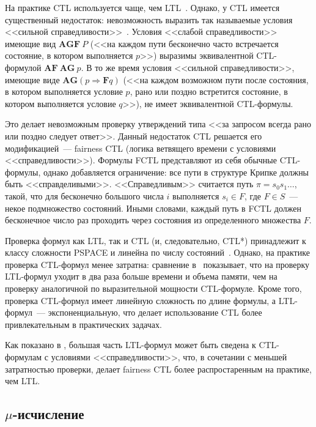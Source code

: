 \documentclass[a4paper,notitlepage,14pt]{article}
\begin{document}
На практике CTL используется чаще, чем LTL~\cite{Stirling96modaland}. Однако, у CTL
имеется существенный недостаток: невозможность выразить так называемые условия <<сильной
справедливости>>~\cite{Katoen,DBLP:conf/spin/FaragoS09}. Условия <<слабой справедливости>>
имеющие вид $\mathbf{AGF}~P$ (<<на каждом пути бесконечно часто встречается состояние, в
котором выполняется $p$>>) выразимы эквивалентной CTL-формулой $\mathbf{AF~AG}~p$. В то же
время условия <<сильной справедливости>>, имеющие виде $\mathbf{AG} (p \Rightarrow
\mathbf{F} q)$ (<<на каждом возможном пути после состояния, в котором выполняется условие
$p$, рано или поздно встретится состояние, в котором выполняется условие $q$>>), не имеет
эквивалентной CTL-формулы.

Это делает невозможным проверку утверждений типа <<за запросом всегда рано или поздно
следует ответ>>. Данный недостаток CTL решается его модификацией~--- fairness CTL (логика
ветвящего времени с условиями <<справедливости>>). Формулы FCTL представляют из себя
обычные CTL-формулы, однако добавляется ограничение: все пути в структуре Крипке должны
быть <<справделивыми>>. <<Справедливым>> считается путь $\pi = s_0s_1\ldots$, такой, что
для бесконечно большого числа $i$ выполняется $s_i \in F$, где $F \in S$~--- некое
подмножество состояний. Иными словами, каждый путь в FCTL должен бесконечное число раз
проходить через состояния из определенного множества $F$.

Проверка формул как LTL, так и CTL (и, следовательно, CTL*) принадлежит к классу сложности
PSPACE и линейна по числу состояний~\cite{Sistla85complexity}. Однако, на практике
проверка CTL-формул менее затратна: сравнение в~\cite{DBLP:conf/spin/FaragoS09}
показывает, что на проверку LTL-формул уходит в два раза больше времени и объема памяти,
чем на проверку аналогичной по выразительной мощности CTL-формуле. Кроме того, проверка
CTL-формул имеет линейную сложность по длине формулы, а LTL-формул~--- экспоненциальную,
что делает использование CTL более привлекательным в практических задачах.

Как показано в \cite{Clarke97anotherlook}, большая часть LTL-формул может быть сведена к
CTL-формулам с условиями <<справедливости>>, что, в сочетании с меньшей затратностью
проверки, делает fairness CTL более распростаренным на практике, чем LTL.


\subsection{$\mu$-исчисление}
\label{sec:mu-calculus}
\end{document}
